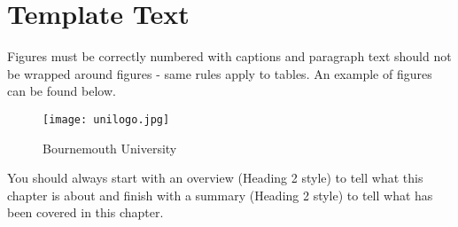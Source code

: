 














\iffalse
	\section{Template Text}
	Figures must be correctly numbered with captions and paragraph text should not be wrapped around figures - same rules apply to tables. An example of figures can be found below.
	\begin{figure}[t]
		\centering
		\texttt{[image: unilogo.jpg]}
		\caption{Bournemouth University}
		\label{fig:BULogo2}
	\end{figure}
	You should always start with an overview (Heading 2 style) to tell what this chapter is about and finish with a summary (Heading 2 style) to tell what has been covered in this chapter.

